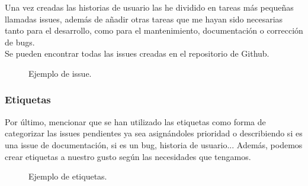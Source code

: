 Una vez creadas las historias de usuario las he dividido en tareas más pequeñas llamadas issues, 
además de añadir otras tareas que me hayan sido necesarias tanto para el desarrollo, como para el mantenimiento, 
documentación o corrección de bugs.\\
Se pueden encontrar todas las issues creadas en el repositorio de Github\cite{issues}.

\begin{figure}[H]
	\centering
	\noindent{}
	\caption{Ejemplo de issue.}
  	\end{figure}

\subsubsection{Etiquetas}

Por último, mencionar que se han utilizado las etiquetas como forma de categorizar las issues pendientes ya sea asignándoles prioridad o describiendo si es una issue de documentación, si es un bug, historia de usuario...
Además, podemos crear etiquetas a nuestro gusto según las necesidades que tengamos.

\begin{figure}[H]
	\centering
	\noindent{}
	\caption{Ejemplo de etiquetas.}
	\end{figure}